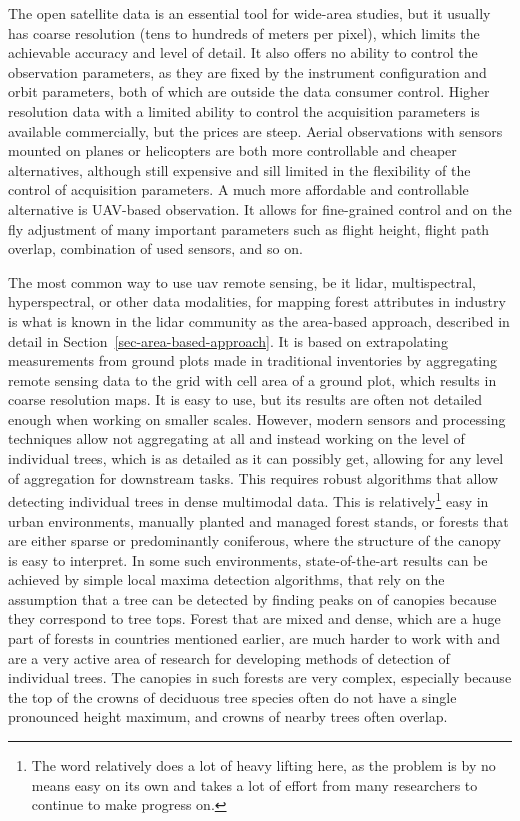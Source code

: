 The open satellite data is an essential tool for wide-area studies, but it usually has coarse resolution (tens to hundreds of meters per pixel), which limits the achievable accuracy and level of detail.
It also offers no ability to control the observation parameters, as they are fixed by the instrument configuration and orbit parameters, both of which are outside the data consumer control.
Higher resolution data with a limited ability to control the acquisition parameters is available commercially, but the prices are steep.
Aerial observations with sensors mounted on planes or helicopters are both more controllable and cheaper alternatives, although still expensive and sill limited in the flexibility of the control of acquisition parameters.
A much more affordable and controllable alternative is UAV-based observation.
It allows for fine-grained control and on the fly adjustment of many important parameters such as flight height, flight path overlap, combination of used sensors, and so on.

The most common way to use \gls{uav} remote sensing, be it \gls{lidar}, multispectral, hyperspectral, or other data modalities, for mapping forest attributes in industry is what is known in the \gls{lidar} community as the area-based approach, described in detail in Section~\ref{sec-area-based-approach}.
It is based on extrapolating measurements from ground plots made in traditional inventories by aggregating remote sensing data to the grid with cell area of a ground plot, which results in coarse resolution maps.
It is easy to use, but its results are often not detailed enough when working on smaller scales.
However, modern sensors and processing techniques allow not aggregating at all and instead working on the level of individual trees, which is as detailed as it can possibly get, allowing for any level of aggregation for downstream tasks.
This requires robust algorithms that allow detecting individual trees in dense multimodal data.
This is relatively\footnote{The word relatively does a lot of heavy lifting here, as the problem is by no means easy on its own and takes a lot of effort from many researchers to continue to make progress on.
} easy in urban environments, manually planted and managed forest stands, or forests that are either sparse or predominantly coniferous, where the structure of the canopy is easy to interpret.
In some such environments, state-of-the-art results can be achieved by simple local maxima detection algorithms, that rely on the assumption that a tree can be detected by finding peaks on of canopies because they correspond to tree tops.
Forest that are mixed and dense, which are a huge part of forests in countries mentioned earlier, are much harder to work with and are a very active area of research for developing methods of detection of individual trees.
The canopies in such forests are very complex, especially because the top of the crowns of deciduous tree species often do not have a single pronounced height maximum, and crowns of nearby trees often overlap.

